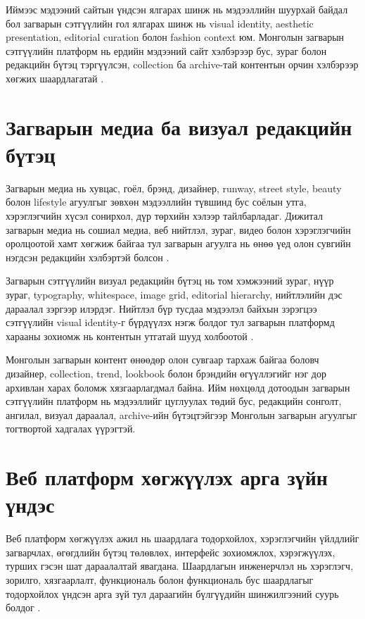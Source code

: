 Иймээс мэдээний сайтын үндсэн ялгарах шинж нь мэдээллийн шуурхай байдал бол загварын сэтгүүлийн гол ялгарах шинж нь visual identity, aesthetic presentation, editorial curation болон fashion context юм. Монголын загварын сэтгүүлийн платформ нь ердийн мэдээний сайт хэлбэрээр бус, зураг болон редакцийн бүтэц тэргүүлсэн, collection ба archive-тай контентын орчин хэлбэрээр хөгжих шаардлагатай \cite{lynge_jorlen_2012}.

\section{Загварын медиа ба визуал редакцийн бүтэц}

Загварын медиа нь хувцас, гоёл, брэнд, дизайнер, runway, street style, beauty болон lifestyle агуулгыг зөвхөн мэдээллийн түвшинд бус соёлын утга, хэрэглэгчийн хүсэл сонирхол, дүр төрхийн хэлээр тайлбарладаг. Дижитал загварын медиа нь сошиал медиа, веб нийтлэл, зураг, видео болон хэрэглэгчийн оролцоотой хамт хөгжиж байгаа тул загварын агуулга нь өнөө үед олон сувгийн нэгдсэн редакцийн хэлбэртэй болсон \cite{rocamora_2017_digital_fashion}.

Загварын сэтгүүлийн визуал редакцийн бүтэц нь том хэмжээний зураг, нүүр зураг, typography, whitespace, image grid, editorial hierarchy, нийтлэлийн дэс дараалал зэргээр илэрдэг. Нийтлэл бүр тусдаа мэдээлэл байхын зэрэгцээ сэтгүүлийн visual identity-г бүрдүүлэх нэгж болдог тул загварын платформд харааны зохиомж нь контентын утгатай шууд холбоотой \cite{lynge_jorlen_2012}.

Монголын загварын контент өнөөдөр олон сувгаар тархаж байгаа боловч дизайнер, collection, trend, lookbook болон брэндийн өгүүллэгийг нэг дор архивлан харах боломж хязгаарлагдмал байна. Ийм нөхцөлд дотоодын загварын сэтгүүлийн платформ нь мэдээллийг цуглуулах төдий бус, редакцийн сонголт, ангилал, визуал дараалал, archive-ийн бүтэцтэйгээр Монголын загварын агуулгыг тогтвортой хадгалах үүрэгтэй.

\section{Веб платформ хөгжүүлэх арга зүйн үндэс}

Веб платформ хөгжүүлэх ажил нь шаардлага тодорхойлох, хэрэглэгчийн үйлдлийг загварчлах, өгөгдлийн бүтэц төлөвлөх, интерфейс зохиомжлох, хэрэгжүүлэх, турших гэсэн шат дараалалтай явагдана. Шаардлагын инженерчлэл нь хэрэглэгч, зорилго, хязгаарлалт, функциональ болон функциональ бус шаардлагыг тодорхойлох үндсэн арга зүй тул дараагийн бүлгүүдийн шинжилгээний суурь болдог \cite{iso_29148_2018}.

